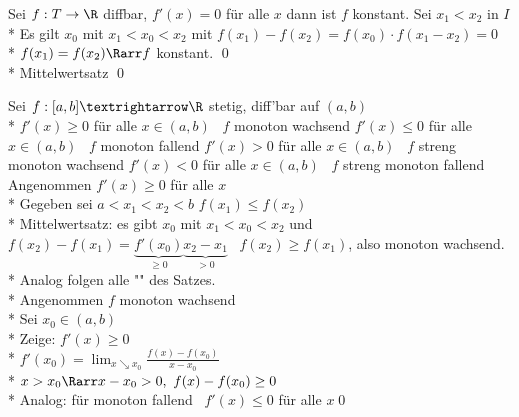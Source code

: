 Sei $f: T \to \R$ diffbar, $f'(x) = 0$ für alle $x$ dann ist $f$ konstant.
\bew
Sei $x_1 < x_2$ in $I$\\*
Es gilt $x_0$ mit $x_1 < x_0 < x_2$ mit $f(x_1) - f(x_2) = f(x_0) \cdot f(x_1 - x_2) = 0$\\*
\Rarr{} $f(x_1) = f(x_2) \Rarr f$ konstant. \qed{}\\*
Mittelwertsatz \qed

Sei $f:[a,b]→\R$ stetig, diff'bar auf $(a,b)$\\*
$f'(x)\geq 0$ für alle $x\in (a,b)$ \equ\ $f$ monoton wachsend
$f'(x)\leq 0$ für alle $x\in (a,b)$ \equ\ $f$ monoton fallend
$f'(x)> 0$ für alle $x\in (a,b)$ \Rarr\ $f$ streng monoton wachsend
$f'(x)< 0$ für alle $x\in (a,b)$ \Rarr\ $f$ streng monoton fallend
\bew
Angenommen $f'(x)\geq 0$ für alle $x$\\*
Gegeben sei $a<x_1<x_2<b$
$f(x_1)\leq f(x_2)$\\*
Mittelwertsatz: es gibt $x_0$ mit $x_1<x_0<x_2$ und $f(x_2)-f(x_1)=\underbrace{f'(x_0)}_{\geq 0}\underbrace{x_2-x_1}_{>0}$ \Rarr\ $f(x_2)\geq f(x_1)$, also monoton wachsend.\\*
Analog folgen alle "\Rarr" des Satzes.\\*
Angenommen $f$ monoton wachsend\\*
Sei $x_0 \in (a, b)$\\*
Zeige: $f'(x) \geq 0$\\*
$f'(x_0) = \lim_{x \searrow x_0}\frac{f(x) - f(x_0)}{x - x_0}$\\*
$x > x_0 \Rarr x - x_0 > 0,\ f(x) - f(x_0) \geq 0$\\*
Analog: für monoton fallend \Rarr\ $f'(x)\leq 0$ für alle $x$\qed
\bsp
